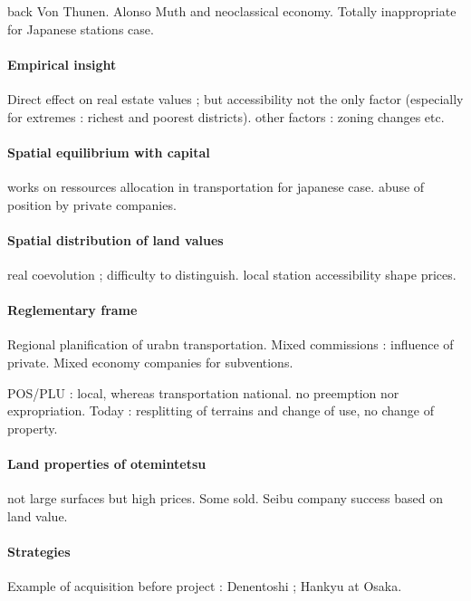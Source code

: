 back Von Thunen. Alonso Muth and neoclassical economy. Totally inappropriate for Japanese stations case.

\paragraph{Empirical insight}

Direct effect on real estate values ; but accessibility not the only factor (especially for extremes : richest and poorest districts). other factors : zoning changes etc.

\paragraph{Spatial equilibrium with capital}

works on ressources allocation in transportation for japanese case. abuse of position by private companies.

\paragraph{Spatial distribution of land values}

real coevolution ; difficulty to distinguish. local station accessibility shape prices.


\paragraph{Reglementary frame}

Regional planification of urabn transportation. Mixed commissions : influence of private. Mixed economy companies for subventions.

POS/PLU : local, whereas transportation national. no preemption nor expropriation. Today : resplitting of terrains and change of use, no change of property.

\paragraph{Land properties of otemintetsu}

not large surfaces but high prices. Some sold. Seibu company success based on land value.

\paragraph{Strategies}

Example of acquisition before project : Denentoshi ; Hankyu at Osaka. 

